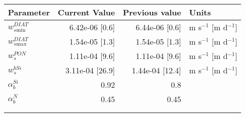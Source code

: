    \small
   \centering
   \begin{tabular}{lrrl}\toprule
    Parameter & Current Value & Previous value & Units \\ \midrule
     $w_{s\mathrm{min}}^{DIAT}$ & 6.42e-06 [0.6] & 6.44e-06 [0.6] & m s$^{-1}$ [m d$^{-1}$] \\
     $w_{s\mathrm{max}}^{DIAT}$ & 1.54e-05 [1.3] & 1.54e-05 [1.3] & m s$^{-1}$ [m d$^{-1}$] \\
     $w_{s}^{PON}$ & 1.11e-04 [9.6] & 1.11e-04 [9.6] & m s$^{-1}$ [m d$^{-1}$] \\
     $w_{s}^{bSi}$ & 3.11e-04 [26.9] & 1.44e-04 [12.4] & m s$^{-1}$ [m d$^{-1}$] \\
     $\alpha_b^{Si}$ & 0.92 & 0.8 &  \\
     $\alpha_b^{N}$ & 0.45 & 0.45 &  \\
   \midrule
 \\ \\   \end{tabular}
